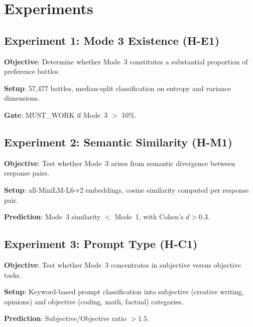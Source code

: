 \section{Experiments}

\subsection{Experiment 1: Mode 3 Existence (H-E1)}

\textbf{Objective}: Determine whether Mode~3 constitutes a substantial proportion of preference battles.

\textbf{Setup}: 57,477 battles, median-split classification on entropy and variance dimensions.

\textbf{Gate}: MUST\_WORK if Mode~3 $>$ 10\%.

\subsection{Experiment 2: Semantic Similarity (H-M1)}

\textbf{Objective}: Test whether Mode~3 arises from semantic divergence between response pairs.

\textbf{Setup}: all-MiniLM-L6-v2 embeddings, cosine similarity computed per response pair.

\textbf{Prediction}: Mode~3 similarity $<$ Mode~1, with Cohen's $d > 0.3$.

\subsection{Experiment 3: Prompt Type (H-C1)}

\textbf{Objective}: Test whether Mode~3 concentrates in subjective versus objective tasks.

\textbf{Setup}: Keyword-based prompt classification into subjective (creative writing, opinions) and objective (coding, math, factual) categories.

\textbf{Prediction}: Subjective/Objective ratio $> 1.5$.
